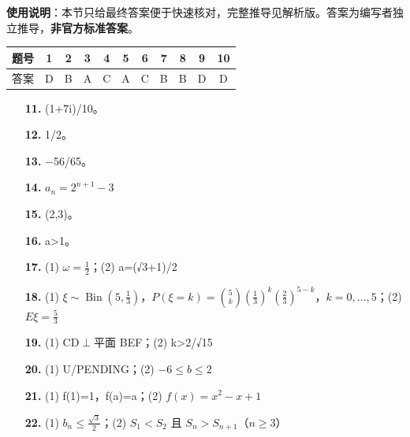 
\begin{gknotice}
\textbf{使用说明}：本节只给最终答案便于快速核对，完整推导见解析版。答案为编写者独立推导，\textbf{非官方标准答案}。
\end{gknotice}

\begin{center}\begin{tabular}{ccccccccccc}
\toprule
题号 & 1 & 2 & 3 & 4 & 5 & 6 & 7 & 8 & 9 & 10 \\
\midrule
答案 & D & B & A & C & A & C & B & B & D & D \\
\bottomrule
\end{tabular}\end{center}

\begin{itemize}[leftmargin=2.6em]
  \item[\textbf{11.}] (1+7i)/10。
  \item[\textbf{12.}] 1/2。
  \item[\textbf{13.}] $-$56/65。
  \item[\textbf{14.}] $a_n=2^{n+1}-3$
  \item[\textbf{15.}] (2,3)。
  \item[\textbf{16.}] a>1。
\end{itemize}

\begin{itemize}[leftmargin=2.6em]
  \item[\textbf{17.}] (1) $\omega=\frac12$；(2) a=(√3+1)/2
  \item[\textbf{18.}] (1) $\xi\sim\operatorname{Bin}(5,\frac13)$，$P(\xi=k)=\binom{5}{k}(\frac13)^k(\frac23)^{5-k}$，$k=0,\ldots,5$；(2) $E\xi=\frac53$
  \item[\textbf{19.}] (1) CD$\perp$平面 BEF；(2) k>2/√15
  \item[\textbf{20.}] (1) U/PENDING；(2) $-6\le b\le2$
  \item[\textbf{21.}] (1) f(1)=1，f(a)=a；(2) $f(x)=x^2-x+1$
  \item[\textbf{22.}] (1) $b_n\le\frac{\sqrt3}{2}$；(2) $S_1<S_2$ 且 $S_n>S_{n+1}$（$n\ge3$）
\end{itemize}

